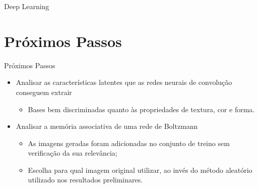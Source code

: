 \documentclass{beamer}
\begin{document}
\begin{frame}{Deep Learning}
\section{Próximos Passos}
\begin{frame}{Próximos Passos}
  \begin{itemize}
  \item Analisar as características latentes que as redes neurais de convolução conseguem extrair
    \begin{itemize}
      \item Bases bem discriminadas quanto às propriedades de textura, cor e forma.
    \end{itemize}
  \item Analisar a memória associativa de uma rede de Boltzmann 
  \begin{itemize}
    \item As imagens geradas foram adicionadas no conjunto de treino sem verificação da sua relevância;
    \item Escolha para qual imagem original utilizar, ao invés do método aleatório utilizado nos resultados preliminares.
  \end{itemize}
  \end{itemize}




\end{frame}
\end{frame}
\end{document}
